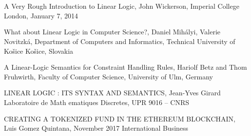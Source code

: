 
\section*{}
\begin{thebibliography}{99999}
	 {A Very Rough Introduction to Linear Logic, John Wickerson, Imperial College London, January 7, 2014}
	
	 {What about Linear Logic in Computer Science?, Daniel Mihályi, Valerie Novitzká, Department of Computers and Informatics, Technical University of Košice Košice, Slovakia}
	
	 {A Linear-Logic Semantics for Constraint Handling Rules, Hariolf Betz and Thom Fruhwirth, Faculty of Computer Science, University of Ulm, Germany}
	
	 {LINEAR LOGIC : ITS SYNTAX AND SEMANTICS, Jean-Yves Girard Laboratoire de Math ematiques Discretes, UPR 9016 – CNRS}
	
	 {CREATING A TOKENIZED FUND IN THE ETHEREUM BLOCKCHAIN, Luis Gomez Quintana, November 2017 International Business}
\end{thebibliography}

